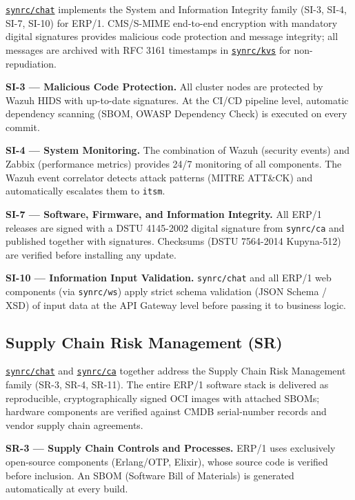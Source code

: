 \documentclass{article}
\begin{document}
\href{https://github.com/synrc/chat}{\texttt{synrc/chat}} implements the System and Information Integrity family (SI-3, SI-4, SI-7, SI-10) for ERP/1. CMS/S-MIME end-to-end encryption with mandatory digital signatures provides malicious code protection and message integrity; all messages are archived with RFC 3161 timestamps in \href{https://github.com/synrc/kvs}{\texttt{synrc/kvs}} for non-repudiation.

\textbf{SI-3 --- Malicious Code Protection.}
All cluster nodes are protected by Wazuh HIDS with up-to-date signatures. At the CI/CD pipeline level, automatic dependency scanning (SBOM, OWASP Dependency Check) is executed on every commit.

\textbf{SI-4 --- System Monitoring.}
The combination of Wazuh (security events) and Zabbix (performance metrics) provides 24/7 monitoring of all components. The Wazuh event correlator detects attack patterns (MITRE ATT\&CK) and automatically escalates them to \texttt{itsm}.

\textbf{SI-7 --- Software, Firmware, and Information Integrity.}
All ERP/1 releases are signed with a DSTU 4145-2002 digital signature from \texttt{synrc/ca} and published together with signatures. Checksums (DSTU 7564-2014 Kupyna-512) are verified before installing any update.

\textbf{SI-10 --- Information Input Validation.}
\texttt{synrc/chat} and all ERP/1 web components (via \texttt{synrc/ws}) apply strict schema validation (JSON Schema / XSD) of input data at the API Gateway level before passing it to business logic.

\subsection{Supply Chain Risk Management (SR)}

\href{https://github.com/synrc/chat}{\texttt{synrc/chat}} and \href{https://github.com/synrc/ca}{\texttt{synrc/ca}} together address the Supply Chain Risk Management family (SR-3, SR-4, SR-11). The entire ERP/1 software stack is delivered as reproducible, cryptographically signed OCI images with attached SBOMs; hardware components are verified against CMDB serial-number records and vendor supply chain agreements.

\textbf{SR-3 --- Supply Chain Controls and Processes.}
ERP/1 uses exclusively open-source components (Erlang/OTP, Elixir), whose source code is verified before inclusion. An SBOM (Software Bill of Materials) is generated automatically at every build.
\end{document}
